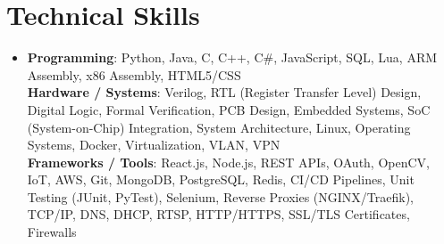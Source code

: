 \documentclass[letterpaper,10pt]{article}
\begin{document}
\section{Technical Skills}
 \begin{itemize}[leftmargin=0.15in, label={}]
    \item {\small
    \textbf{Programming}{: Python, Java, C, C++, C\#, JavaScript, SQL, Lua, ARM Assembly, x86 Assembly, HTML5/CSS} \\
    \textbf{Hardware / Systems}{: Verilog, RTL (Register Transfer Level) Design, Digital Logic, Formal Verification, PCB Design, Embedded Systems, SoC (System-on-Chip) Integration, System Architecture, Linux, Operating Systems, Docker, Virtualization, VLAN, VPN} \\
    \textbf{Frameworks / Tools}{: React.js, Node.js, REST APIs, OAuth, OpenCV, IoT, AWS, Git, MongoDB, PostgreSQL, Redis, CI/CD Pipelines, Unit Testing (JUnit, PyTest), Selenium, Reverse Proxies (NGINX/Traefik), TCP/IP, DNS, DHCP, RTSP, HTTP/HTTPS, SSL/TLS Certificates, Firewalls}}
 \end{itemize}
\end{document}
